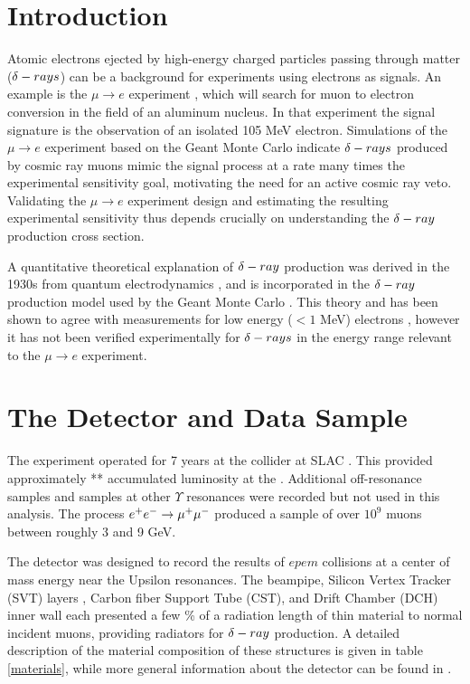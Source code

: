 \documentclass[review]{elsarticle}
\def\deltaray{\ensuremath{{\rm \delta}-ray}\xspace}
\def\deltarays{\ensuremath{{\rm \delta}-rays}\xspace}
\def\eetomm{\ensuremath{ \epem \to \mumu}\xspace}
\def\mutoe{\ensuremath{\mu \to e}\xspace}
\begin{document}
\linenumbers

\section{Introduction}
Atomic electrons ejected by high-energy charged particles passing through
matter (\deltarays) can be a background for experiments using electrons as
signals.  An example is the \mutoe experiment \cite{mutoe}, which will search for muon
to electron conversion in the field of an aluminum nucleus.  In that experiment
the signal signature is the observation of an isolated 105 MeV electron.
Simulations of the \mutoe experiment based on the Geant \cite{g4} Monte Carlo
indicate \deltarays produced by cosmic ray muons mimic the signal process
at a rate many times the experimental sensitivity goal, motivating
the need for an active cosmic ray veto.  Validating the \mutoe experiment design
and estimating the resulting experimental sensitivity thus depends crucially on
understanding the \deltaray production cross section.

A quantitative theoretical explanation of \deltaray production was derived in
the 1930s from quantum electrodynamics \cite{drtheory}, and is incorporated in the
\deltaray production model used by the Geant Monte Carlo \cite{g4}.  This theory
and has been shown to agree with measurements for low energy ($< 1$ MeV)
electrons \cite{drexpt}, however it has not been verified experimentally for
\deltarays in the energy range relevant to the \mutoe experiment.


\section{The \babar Detector and Data Sample}

The \babar experiment operated for 7 years at the 
\pepII collider at SLAC \cite{pepII}.
This provided approximately ** accumulated luminosity at the \FourS.  Additional
off-resonance samples and samples at other $\Upsilon$ resonances were recorded but
not used in this analysis.  The process \eetomm produced a sample of over
$10^9$ muons between roughly 3 and 9 GeV.

The \babar detector was designed to record the results of $epem$ collisions at
a center of mass energy near the Upsilon resonances.  The \babar
beampipe, Silicon Vertex Tracker (SVT) layers , Carbon fiber Support Tube
(CST), and  Drift Chamber (DCH) inner wall each presented a few  \% of a
radiation length of thin material to normal incident muons, providing radiators
for \deltaray production.  A detailed description of the material composition
of these structures is given in table \ref{materials}, while more general
information about the \babar detector can be found in \cite{babarnim}.
\end{document}
